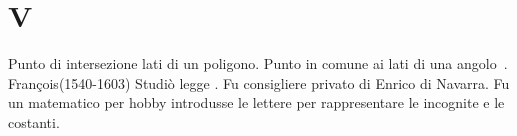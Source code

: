 \chapter{V}
\vspace{5mm}
Punto di intersezione lati di un poligono. Punto in comune ai lati di una angolo\pointsto~.%
 François(1540-1603) Studiò legge . Fu consigliere privato di Enrico di Navarra. Fu un matematico per hobby introdusse le lettere per rappresentare le incognite e le costanti.\cite{Kline1972} \cite{Boyer1980}